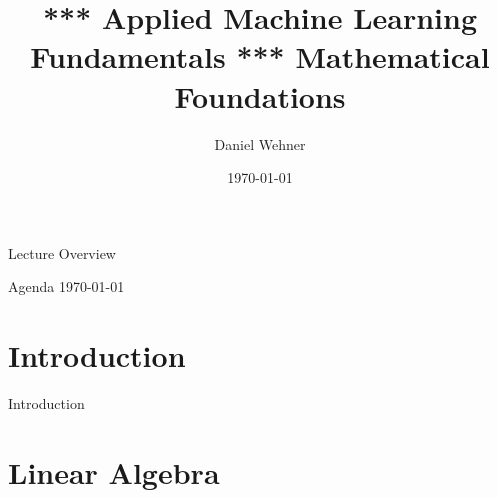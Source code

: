 


\title[Mathematical Foundations]{*** Applied Machine Learning Fundamentals *** Mathematical Foundations}
\author{Daniel Wehner}
\date{\today}




\maketitlepage


\begin{frame}{Lecture Overview}{}
\end{frame}


\begin{frame}{Agenda \today}
	\begin{multicols}{2}
		\tableofcontents
	\end{multicols}
\end{frame}


\section{Introduction}

\begin{frame}{Introduction}{}

\end{frame}


\section{Linear Algebra}

